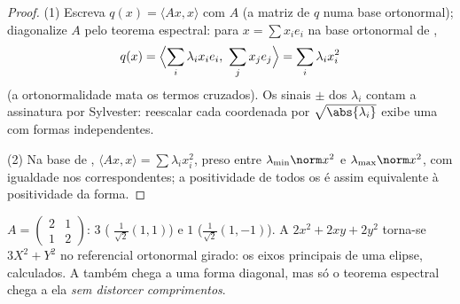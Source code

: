 \begin{proof}
(1) Escreva $q(x) = \langle A x, x\rangle$ com $A$  (a
matriz de $q$ numa base ortonormal); diagonalize $A$ pelo
teorema espectral: para $x = \sum x_ie_i$ na base ortonormal
de ,
\[
q(x) = \Bigl\langle \sum_i \lambda_ix_ie_i,\ \sum_j
x_je_j\Bigr\rangle = \sum_i \lambda_i x_i^2
\]
(a ortonormalidade mata os termos cruzados). Os sinais $\pm$ dos
$\lambda_i$ contam a assinatura por Sylvester: reescalar cada
coordenada por $\sqrt{\abs{\lambda_i}}$ exibe uma  com formas independentes.

(2) Na base de , $\langle Ax, x\rangle = \sum \lambda_i
x_i^2$, preso entre $\lambda_{\min}\norm x^2$ e
$\lambda_{\max}\norm x^2$, com igualdade nos 
correspondentes; a positividade de todos os  é assim equivalente
à positividade da forma.
\end{proof}

\begin{example}\label{ex:b2:quadratic:spectralexample}
$A = \begin{pmatrix} 2 & 1\\ 1 & 2 \end{pmatrix}$:  $3$
( $\frac{1}{\sqrt2}(1,1)$) e $1$
($\frac{1}{\sqrt2}(1,-1)$). A  $2x^2 + 2xy + 2y^2$
torna-se $3X^2 + Y^2$ no referencial ortonormal girado: os eixos
principais de uma elipse, calculados. A  também chega a uma forma
diagonal, mas só o teorema espectral chega a ela \emph{sem
distorcer comprimentos}.
\end{example}

